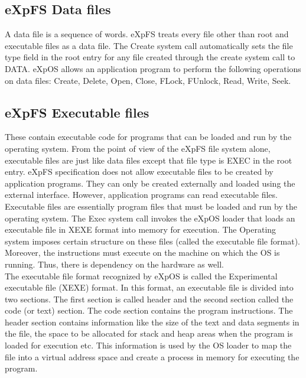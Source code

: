 \subsection{eXpFS Data files}
A data file is a sequence of words. eXpFS treats every file other than root and executable files as a data file. The Create system call automatically sets the file type field in the root entry for any file created through the create system call to DATA. eXpOS allows an application program to perform the following operations on data files: Create, Delete, Open, Close, FLock, FUnlock, Read, Write, Seek.  

\subsection{eXpFS Executable files}
 These contain executable code for programs that can be loaded and run by the operating system. From the point of view of the eXpFS file system alone, executable files are just like data files except that file type is EXEC in the root entry. eXpFS specification does not allow executable files to be created by application programs. They can only be created externally and loaded using the external interface. However, application programs can read executable files.
\\

Executable files are essentially program files that must be loaded and run by the operating system. The Exec system call invokes the eXpOS loader that loads an executable file in XEXE format into memory for execution. The Operating system imposes certain structure on these files (called the executable file format). Moreover, the instructions must execute on the machine on which the OS is running. Thus, there is dependency on the hardware as well.
\\

The executable file format recognized by eXpOS is called the Experimental executable file (XEXE) format. In this format, an executable file is divided into two sections. The first section is called header and the second section called the code (or text) section. The code section contains the program instructions. The header section contains information like the size of the text and data segments in the file, the space to be allocated for stack and heap areas when the program is loaded for execution etc. This information is used by the OS loader to map the file into a virtual address space and create a process in memory for executing the program.


